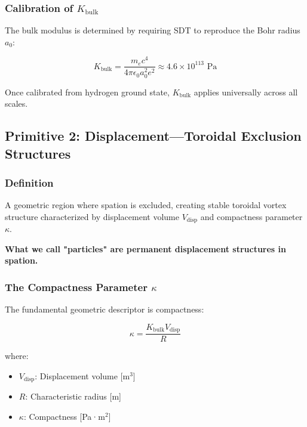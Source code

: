 \subsubsection{Calibration of $K_{\text{bulk}}$}

The bulk modulus is determined by requiring SDT to reproduce the Bohr radius $a_0$:

\begin{equation}
K_{\text{bulk}} = \frac{m_e c^4}{4\pi \epsilon_0 a_0^2 e^2} \approx 4.6 \times 10^{113} \text{ Pa}
\label{eq:Kbulk_calibration}
\end{equation}

Once calibrated from hydrogen ground state, $K_{\text{bulk}}$ applies universally across all scales.

\subsection{Primitive 2: Displacement—Toroidal Exclusion Structures}

\subsubsection{Definition}

\begin{definition}[Displacement]
A geometric region where spation is excluded, creating stable toroidal vortex structure characterized by displacement volume $V_{\text{disp}}$ and compactness parameter $\kappa$.
\end{definition}

\textbf{What we call "particles" are permanent displacement structures in spation.}

\subsubsection{The Compactness Parameter $\kappa$}

The fundamental geometric descriptor is compactness:

\begin{equation}
\kappa = \frac{K_{\text{bulk}} V_{\text{disp}}}{R}
\label{eq:kappa_definition}
\end{equation}

where:
\begin{itemize}
\item $V_{\text{disp}}$: Displacement volume [m$^3$]
\item $R$: Characteristic radius [m]
\item $\kappa$: Compactness [Pa·m$^2$]
\end{itemize}

